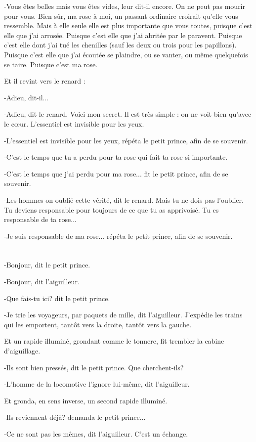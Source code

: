 \documentclass{report}
\newcommand{\parachapter}[2][]{\chapter[#1]{#2}}
\begin{document}
-Vous êtes belles mais vous êtes vides, leur dit-il encore. On ne peut pas mourir pour vous. Bien sûr, ma rose à moi, un passant ordinaire croirait qu'elle vous ressemble. Mais à elle seule elle est plus importante que vous toutes, puisque c'est elle que j'ai arrosée. Puisque c'est elle que j'ai abritée par le paravent. Puisque c'est elle dont j'ai tué les chenilles (sauf les deux ou trois pour les papillons). Puisque c'est elle que j'ai écoutée se plaindre, ou se vanter, ou même quelquefois se taire. Puisque c'est ma rose.

Et il revint vers le renard :

-Adieu, dit-il...

-Adieu, dit le renard. Voici mon secret. Il est très simple : on ne voit bien qu'avec le cœur. L'essentiel est invisible pour les yeux.

-L'essentiel est invisible pour les yeux, répéta le petit prince, afin de se souvenir.

-C'est le temps que tu a perdu pour ta rose qui fait ta rose si importante.

-C'est le temps que j'ai perdu pour ma rose... fit le petit prince, afin de se souvenir.

-Les hommes on oublié cette vérité, dit le renard. Mais tu ne dois pas l'oublier. Tu deviens responsable pour toujours de ce que tu as apprivoisé. Tu es responsable de ta rose...

-Je suis responsable de ma rose... répéta le petit prince, afin de se souvenir.
\parachapter{} %
-Bonjour, dit le petit prince.

-Bonjour, dit l'aiguilleur.

-Que fais-tu ici? dit le petit prince.

-Je trie les voyageurs, par paquets de mille, dit l'aiguilleur. J'expédie les trains qui les emportent, tantôt vers la droite, tantôt vers la gauche.

Et un rapide illuminé, grondant comme le tonnere, fit trembler la cabine d'aiguillage.

-Ils sont bien pressés, dit le petit prince. Que cherchent-ils?

-L'homme de la locomotive l'ignore lui-même, dit l'aiguilleur.

Et gronda, en sens inverse, un second rapide illuminé.

-Ils reviennent déjà? demanda le petit prince...

-Ce ne sont pas les mêmes, dit l'aiguilleur. C'est un échange.
\end{document}

